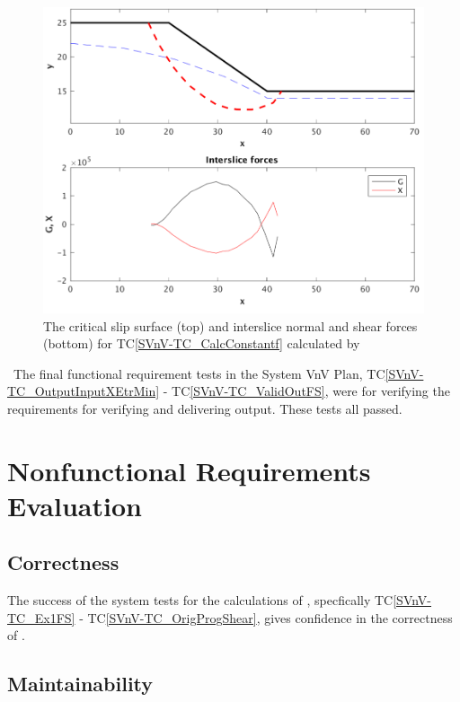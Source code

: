 \documentclass[12pt, titlepage]{article}
\newcommand{\tcref}[1]{TC\ref{#1}}
\begin{document}
\begin{figure}[h!]
	\begin{center}
		\includegraphics[width=1.0\textwidth]{ConstFPlots.png}
		\caption{The critical slip surface (top) and interslice normal and 
		shear forces (bottom) for  \tcref{SVnV-TC_CalcConstantf} calculated by 
		\progname{}}
		\label{Fig:ConstF}
	\end{center}
\end{figure}

~\newline \noindent The final functional requirement tests in the System VnV 
Plan, \tcref{SVnV-TC_OutputInputXEtrMin} - \tcref{SVnV-TC_ValidOutFS}, were for 
verifying the requirements for verifying and delivering output. These tests all 
passed.

\section{Nonfunctional Requirements Evaluation} \label{sec_NonFuncReqEval}

\subsection{Correctness}

The success of the system tests for the calculations of \progname{}, 
specfically \tcref{SVnV-TC_Ex1FS} - \tcref{SVnV-TC_OrigProgShear}, gives 
confidence in the correctness of \progname{}.

\subsection{Maintainability}
\end{document}
